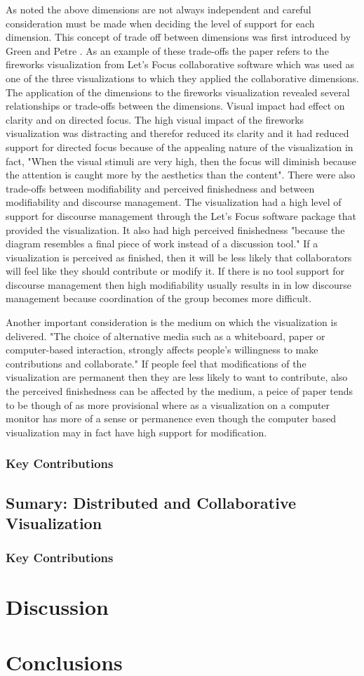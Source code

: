 \documentclass{sig-alternate}
\begin{document}
As noted the above dimensions are not always independent and careful
consideration must be made when deciding the level of support for each
dimension. This concept of trade off between dimensions was first introduced by
Green and Petre \cite{}. As an example of these trade-offs the paper refers to
the fireworks visualization from Let's Focus collaborative software which was
used as one of the three visualizations to which they applied the collaborative
dimensions.  The application of the dimensions to the fireworks visualization
revealed several relationships or trade-offs between the dimensions. Visual
impact had effect on clarity and on directed focus. The high visual impact of
the fireworks visualization was distracting and therefor reduced its clarity and
it had reduced support for directed focus because of the appealing nature of the
visualization in fact, "When the visual stimuli are very high, then the focus
will diminish because the attention is caught more by the aesthetics than the
content". There were also trade-offs between modifiability and perceived
finishedness and  between modifiability and discourse management. The
visualization had a high level of support for discourse management through the
Let's Focus software package that provided the visualization. It also had high
perceived finishedness "because the diagram resembles a final piece of work
instead of a discussion tool." If a visualization is perceived as finished, then
it will be less likely that collaborators will feel like they should contribute
or modify it. If there is no tool support for discourse management then high
modifiability usually results in in low discourse management because
coordination of the group becomes more difficult.


Another important consideration is the medium on which the visualization is
delivered.  "The choice of alternative media such as a whiteboard, paper or
computer-based interaction, strongly affects people's willingness to make
contributions and collaborate." If people feel that modifications of the
visualization are permanent then they are less likely to want to contribute,
also the perceived finishedness can be affected by the medium, a peice of paper
tends to be though of as more provisional where as a visualization on a computer
monitor has more of a sense or permanence even though the computer based
visualization may in fact have high support for modification.
\subsubsection{Key Contributions}
\subsection{Sumary: Distributed and Collaborative Visualization}
\subsubsection{Key Contributions}
\section{Discussion}
\section{Conclusions}

\end{document}
